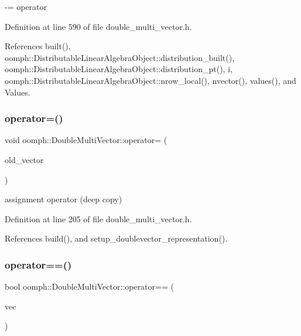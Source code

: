 -\/= operator 



Definition at line 590 of file double\+\_\+multi\+\_\+vector.\+h.



References built(), oomph\+::\+Distributable\+Linear\+Algebra\+Object\+::distribution\+\_\+built(), oomph\+::\+Distributable\+Linear\+Algebra\+Object\+::distribution\+\_\+pt(), i, oomph\+::\+Distributable\+Linear\+Algebra\+Object\+::nrow\+\_\+local(), nvector(), values(), and Values.

\mbox{\label{classoomph_1_1DoubleMultiVector_a7f48a5a0d0330bd6ee2f9b0ac1c5fa08}} 
\subsubsection{\texorpdfstring{operator=()}{operator=()}}
{\footnotesize\ttfamily void oomph\+::\+Double\+Multi\+Vector\+::operator= (\begin{DoxyParamCaption}\item[{const \hyperlink{classoomph_1_1DoubleMultiVector}{Double\+Multi\+Vector} \&}]{old\+\_\+vector }\end{DoxyParamCaption})\hspace{0.3cm}{\ttfamily [inline]}}



assignment operator (deep copy) 



Definition at line 205 of file double\+\_\+multi\+\_\+vector.\+h.



References build(), and setup\+\_\+doublevector\+\_\+representation().

\mbox{\label{classoomph_1_1DoubleMultiVector_ab06d289ff582170e19500861e8bd7e90}} 
\subsubsection{\texorpdfstring{operator==()}{operator==()}}
{\footnotesize\ttfamily bool oomph\+::\+Double\+Multi\+Vector\+::operator== (\begin{DoxyParamCaption}\item[{const \hyperlink{classoomph_1_1DoubleMultiVector}{Double\+Multi\+Vector} \&}]{vec }\end{DoxyParamCaption})\hspace{0.3cm}{\ttfamily [inline]}}



